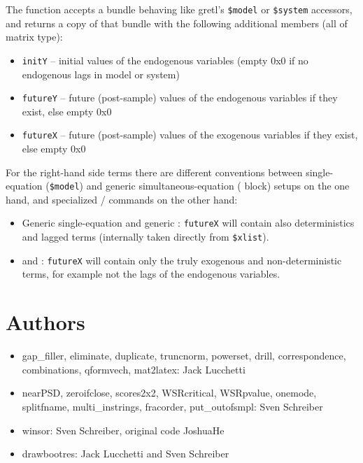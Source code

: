 \documentclass[11pt,english]{article}
\begin{document}
The function accepts a bundle behaving like gretl's \texttt{\$model} or 
\texttt{\$system} accessors, and returns a copy of that bundle with the 
following additional members (all of matrix type):

\begin{itemize}
\item \texttt{initY} -- initial values of the endogenous variables
  (empty 0x0 if no endogenous lags in model or system)
\item \texttt{futureY} -- future (post-sample) values of the endogenous
  variables if they exist, else empty 0x0
\item \texttt{futureX} -- future (post-sample) values of the exogenous
  variables if they exist, else empty 0x0
\end{itemize}

For the right-hand side terms there are different conventions between
single-equation (\texttt{\$model}) and generic simultaneous-equation
( block) setups on the one hand, and specialized   /
 commands on the other hand:
 
\begin{itemize}
\item Generic single-equation and generic : 
  \texttt{futureX} will contain also deterministics and lagged terms 
  (internally taken directly from \texttt{\$xlist}).
 
\item {} and : 
  \texttt{futureX} will contain only the truly exogenous and 
   non-deterministic terms, for example not the lags of the 
   endogenous variables.
\end{itemize}

\section{Authors}
\begin{itemize}
\item gap\_filler, eliminate, duplicate, truncnorm, powerset,
  drill, correspondence, combinations, qformvech, mat2latex: Jack Lucchetti

\item nearPSD, zeroifclose, scores2x2, WSRcritical, WSRpvalue, onemode,
splitfname, multi\_instrings, fracorder, put\_outofsmpl:
Sven Schreiber

\item winsor: Sven Schreiber, original code JoshuaHe

\item drawbootres: Jack Lucchetti and Sven Schreiber

\end{itemize}
\end{document}

